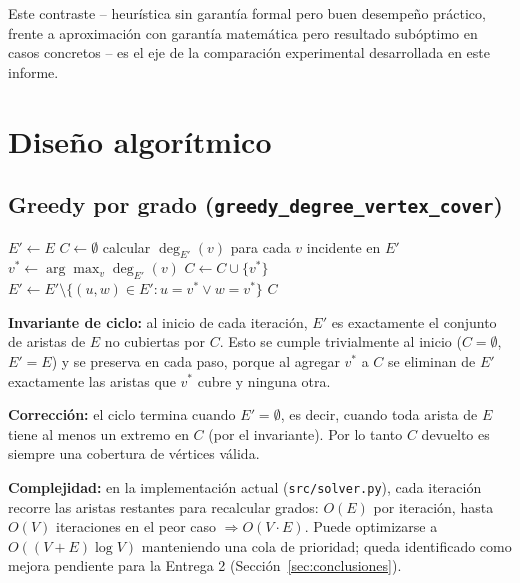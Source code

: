 \documentclass[11pt,a4paper]{article}
\begin{document}
Este contraste -- heurística sin garantía formal pero buen desempeño práctico, frente a
aproximación con garantía matemática pero resultado subóptimo en casos concretos -- es el
eje de la comparación experimental desarrollada en este informe.

\section{Diseño algorítmico}
\label{sec:diseno-algoritmico}

\subsection{Greedy por grado (\texttt{greedy\_degree\_vertex\_cover})}

\begin{algorithm}[H]
\caption{\texttt{greedy\_degree\_vertex\_cover}}
\begin{algorithmic}[1]
\State $E' \gets E$ 
\State $C \gets \emptyset$
	\State calcular $\deg_{E'}(v)$ para cada $v$ incidente en $E'$
	\State $v^{*} \gets \arg\max_v \deg_{E'}(v)$
	\State $C \gets C \cup \{v^{*}\}$
	\State $E' \gets E' \setminus \{(u,w) \in E' : u = v^{*} \lor w = v^{*}\}$
\EndWhile
\State \Return $C$
\end{algorithmic}
\end{algorithm}

\textbf{Invariante de ciclo:} al inicio de cada iteración, $E'$ es exactamente el conjunto
de aristas de $E$ no cubiertas por $C$. Esto se cumple trivialmente al inicio ($C=\emptyset$,
$E'=E$) y se preserva en cada paso, porque al agregar $v^{*}$ a $C$ se eliminan de $E'$
exactamente las aristas que $v^{*}$ cubre y ninguna otra.

\textbf{Corrección:} el ciclo termina cuando $E' = \emptyset$, es decir, cuando toda arista
de $E$ tiene al menos un extremo en $C$ (por el invariante). Por lo tanto $C$ devuelto es
siempre una cobertura de vértices válida.

\textbf{Complejidad:} en la implementación actual (\texttt{src/solver.py}), cada iteración
recorre las aristas restantes para recalcular grados: $O(E)$ por iteración, hasta $O(V)$
iteraciones en el peor caso $\Rightarrow O(V \cdot E)$. Puede optimizarse a
$O((V+E)\log V)$ manteniendo una cola de prioridad; queda identificado como mejora
pendiente para la Entrega 2 (Sección~\ref{sec:conclusiones}).
\end{document}

